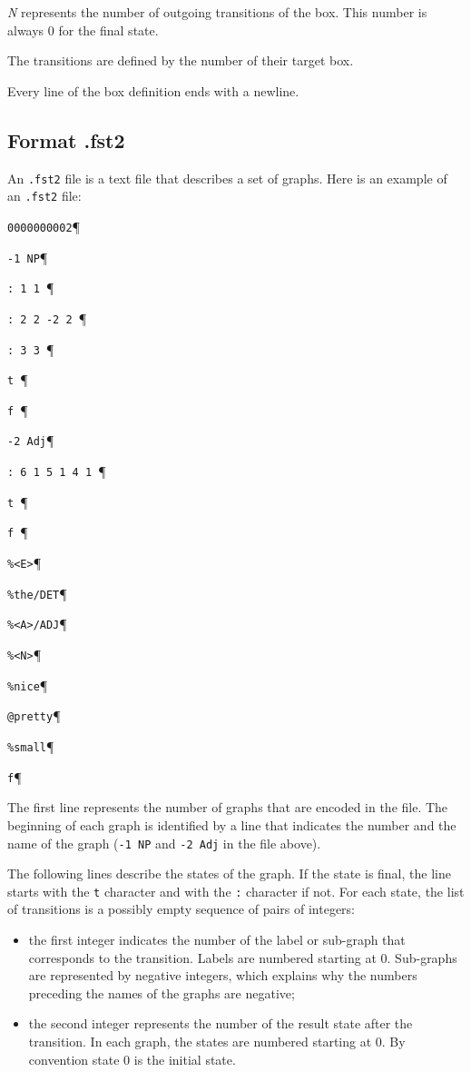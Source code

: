 \bigskip
\noindent \textit{N} represents the number of outgoing transitions of the box.
This number is always $0$ for the final state.

\bigskip
\noindent The transitions are defined by the number of their target box.

\bigskip
\noindent Every line of the box definition ends with a newline.

\subsection{Format .fst2}
An \verb+.fst2+ file is a text file that describes a set of graphs. Here is an
example of an \verb+.fst2+ file:

\bigskip
\verb+0000000002+\P

\verb+-1 NP+\P

\verb+: 1 1 +\P

\verb+: 2 2 -2 2 +\P

\verb+: 3 3 +\P

\verb+t +\P

\verb+f +\P

\verb+-2 Adj+\P

\verb+: 6 1 5 1 4 1 +\P

\verb+t +\P

\verb+f +\P

\verb+%<E>+\P

\verb+%the/DET+\P

\verb+%<A>/ADJ+\P

\verb+%<N>+\P

\verb+%nice+\P

\verb+@pretty+\P

\verb+%small+\P

\verb+f+\P

\bigskip
\noindent The first line represents the number of graphs that are encoded in the
file. The beginning of each graph is identified by a line that indicates the
number and the name of the graph (\verb+-1 NP+ and \verb+-2 Adj+ in the file
above).

\bigskip
\noindent The following lines describe the states of the graph. If the state is
final, the line starts with the \verb+t+ character and with the \verb+:+
character if not. For each state, the list of transitions is a possibly empty
sequence of pairs of integers:

\begin{itemize}
  \item the first integer indicates the number of the label or sub-graph that
  corresponds to the transition. Labels are numbered starting at 0. Sub-graphs
  are represented by negative integers, which explains why the numbers preceding
  the names of the graphs are negative;

  \item the second integer represents the number of the result state after the
  transition. In each graph, the states are numbered starting at 0. By convention
  state 0 is the initial state.

\end{itemize}

